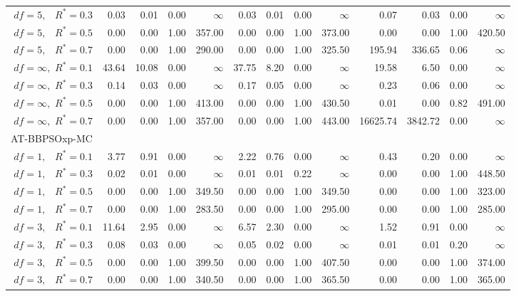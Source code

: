 \documentclass[12pt]{article}
\begin{document}
\begin{table}[ht]
{\begin{tabular}{r|rrrr|rrrr|rrrr}
  $df = 5,\enspace$ $R^* =0.3$ & 0.03 & 0.01 & 0.00 & $\infty$ & 0.03 & 0.01 & 0.00 & $\infty$ & 0.07 & 0.03 & 0.00 & $\infty$ \\ 
  $df = 5,\enspace$ $R^* =0.5$ & 0.00 & 0.00 & 1.00 & 357.00 & 0.00 & 0.00 & 1.00 & 373.00 & 0.00 & 0.00 & 1.00 & 420.50 \\ 
  $df = 5,\enspace$ $R^* =0.7$ & 0.00 & 0.00 & 1.00 & 290.00 & 0.00 & 0.00 & 1.00 & 325.50 & 195.94 & 336.65 & 0.06 & $\infty$ \\ 
  $df = \infty,$ $R^* =0.1$ & 43.64 & 10.08 & 0.00 & $\infty$ & 37.75 & 8.20 & 0.00 & $\infty$ & 19.58 & 6.50 & 0.00 & $\infty$ \\ 
  $df = \infty,$ $R^* =0.3$ & 0.14 & 0.03 & 0.00 & $\infty$ & 0.17 & 0.05 & 0.00 & $\infty$ & 0.23 & 0.06 & 0.00 & $\infty$ \\ 
  $df = \infty,$ $R^* =0.5$ & 0.00 & 0.00 & 1.00 & 413.00 & 0.00 & 0.00 & 1.00 & 430.50 & 0.01 & 0.00 & 0.82 & 491.00 \\ 
  $df = \infty,$ $R^* =0.7$ & 0.00 & 0.00 & 1.00 & 357.00 & 0.00 & 0.00 & 1.00 & 443.00 & 16625.74 & 3842.72 & 0.00 & $\infty$ \\ 
\hline
\multicolumn{1}{l|}{AT-BBPSOxp-MC} &&&&&&&&&&&&\\
  $df = 1,\enspace$ $R^* =0.1$ & 3.77 & 0.91 & 0.00 & $\infty$ & 2.22 & 0.76 & 0.00 & $\infty$ & 0.43 & 0.20 & 0.00 & $\infty$ \\ 
  $df = 1,\enspace$ $R^* =0.3$ & 0.02 & 0.01 & 0.00 & $\infty$ & 0.01 & 0.01 & 0.22 & $\infty$ & 0.00 & 0.00 & 1.00 & 448.50 \\ 
  $df = 1,\enspace$ $R^* =0.5$ & 0.00 & 0.00 & 1.00 & 349.50 & 0.00 & 0.00 & 1.00 & 349.50 & 0.00 & 0.00 & 1.00 & 323.00 \\ 
  $df = 1,\enspace$ $R^* =0.7$ & 0.00 & 0.00 & 1.00 & 283.50 & 0.00 & 0.00 & 1.00 & 295.00 & 0.00 & 0.00 & 1.00 & 285.00 \\ 
  $df = 3,\enspace$ $R^* =0.1$ & 11.64 & 2.95 & 0.00 & $\infty$ & 6.57 & 2.30 & 0.00 & $\infty$ & 1.52 & 0.91 & 0.00 & $\infty$ \\ 
  $df = 3,\enspace$ $R^* =0.3$ & 0.08 & 0.03 & 0.00 & $\infty$ & 0.05 & 0.02 & 0.00 & $\infty$ & 0.01 & 0.01 & 0.20 & $\infty$ \\ 
  $df = 3,\enspace$ $R^* =0.5$ & 0.00 & 0.00 & 1.00 & 399.50 & 0.00 & 0.00 & 1.00 & 407.50 & 0.00 & 0.00 & 1.00 & 374.00 \\ 
  $df = 3,\enspace$ $R^* =0.7$ & 0.00 & 0.00 & 1.00 & 340.50 & 0.00 & 0.00 & 1.00 & 365.50 & 0.00 & 0.00 & 1.00 & 365.00 \\ 

\end{tabular}}
\end{table}
\end{document}
